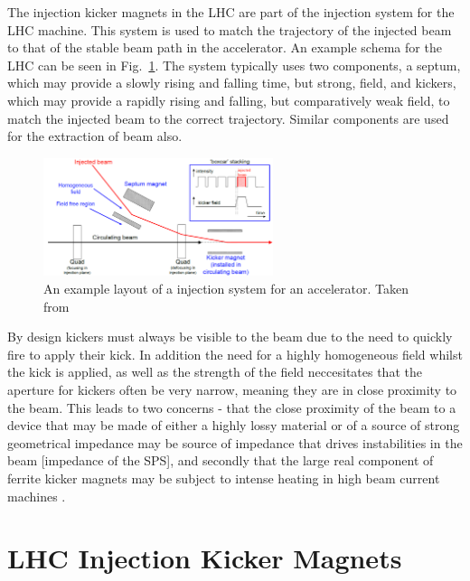 The injection kicker magnets in the LHC are part of the injection system for the LHC machine. This system is used to match the trajectory of the injected beam to that of the stable beam path in the accelerator. An example schema for the LHC can be seen in Fig.~\ref{fig:injection-system-schema}. The system typically uses two components, a septum, which may provide a slowly rising and falling time, but strong, field, and kickers, which may provide a rapidly rising and falling, but comparatively weak field, to match the injected beam to the correct trajectory. Similar components are used for the extraction of beam also.

\begin{figure}
\begin{center}
\includegraphics[width=0.6\textwidth]{LHC_MKI/figures/injection-system.png}
\end{center}
\label{fig:injection-system-schema}
\caption{An example layout of a injection system for an accelerator. Taken from \cite{Barnes:injSys}}
\end{figure}

By design kickers must always be visible to the beam due to the need to quickly fire to apply their kick. In addition the need for a highly homogeneous field whilst the kick is applied, as well as the strength of the field neccesitates that the aperture for kickers often be very narrow, meaning they are in close proximity to the beam. This leads to two concerns - that the close proximity of the beam to a device that may be made of either a highly lossy material \cite{Day:wireMeasFerr, Barnes:wireMeasKick, Barnes:spsKickerHeating} or of a source of strong geometrical impedance \cite{Belver-Aguilar:clicStripline} may be source of impedance that drives instabilities in the beam [impedance of the SPS], and secondly that the large real component of ferrite kicker magnets may be subject to intense heating in high beam current machines \cite{Barnes:spsKickerHeating}. 

\section{LHC Injection Kicker Magnets}

